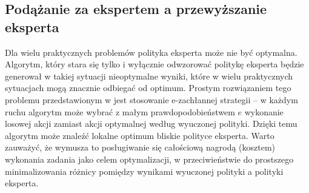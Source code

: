 \subsection{Podążanie za ekspertem a przewyższanie eksperta}
Dla wielu praktycznych problemów polityka eksperta może nie być optymalna. Algorytm, który stara się tylko i wyłącznie odwzorować politykę eksperta będzie generował w takiej sytuacji nieoptymalne wyniki, które w wielu praktycznych sytuacjach mogą znacznie odbiegać od optimum. Prostym rozwiązaniem tego problemu przedstawionym w \cite{DBLP:journals/corr/ChangKADL15} jest stosowanie e-zachłannej strategii – w każdym ruchu algorytm może wybrać z małym prawdopodobieństwem $e$ wykonanie losowej akcji zamiast akcji optymalnej według wyuczonej polityki. Dzięki temu algorytm może znaleźć lokalne optimum bliskie polityce eksperta. Warto zauważyć, że wymusza to posługiwanie się całościową nagrodą (kosztem) wykonania zadania jako celem optymalizacji, w przeciwieństwie do prostszego minimalizowania różnicy pomiędzy wynikami wyuczonej polityki a polityki eksperta.
